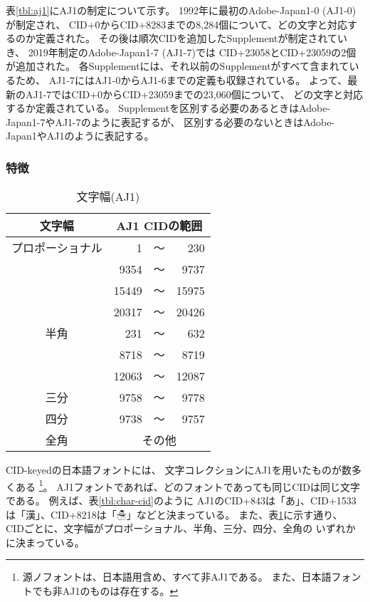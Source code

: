 表\ref{tbl:aj1}にAJ1の制定について示す。
1992年に最初のAdobe-Japan1-0 (AJ1-0)が制定され、
CID+0からCID+8283までの8,284個について、どの文字と対応するのか定義された。
その後は順次CIDを追加したSupplementが制定されていき、
2019年制定のAdobe-Japan1-7 (AJ1-7)では
CID+23058とCID+23059の2個が追加された。
各Supplementには、それ以前のSupplementがすべて含まれているため、
AJ1-7にはAJ1-0からAJ1-6までの定義も収録されている。
よって、最新のAJ1-7ではCID+0からCID+23059までの23,060個について、
どの文字と対応するか定義されている。
Supplementを区別する必要のあるときはAdobe-Japan1-7やAJ1-7のように表記するが、
区別する必要のないときはAdobe-Japan1やAJ1のように表記する。

\subsubsection{特徴}

\begin{table}[tb]
  \centering
  \caption{文字幅(AJ1)}
  \label{tbl:width}
  \small
  \begin{tabular}{c|rcr}
    文字幅 & \multicolumn{3}{c}{AJ1 CIDの範囲} \\
    \hline
    プロポーショナル
    &     1 & ～ &   230 \\
    &  9354 & ～ &  9737 \\
    & 15449 & ～ & 15975 \\
    & 20317 & ～ & 20426 \\
    \arrayrulecolor[gray]{0.7}\hline\arrayrulecolor[gray]{0}
    半角
    &   231 & ～ &   632 \\
    &  8718 & ～ &  8719 \\
    & 12063 & ～ & 12087 \\
    \arrayrulecolor[gray]{0.7}\hline\arrayrulecolor[gray]{0}
    三分
    &  9758 & ～ &  9778 \\
    \arrayrulecolor[gray]{0.7}\hline\arrayrulecolor[gray]{0}
    四分
    &  9738 & ～ &  9757 \\
    \arrayrulecolor[gray]{0.7}\hline\arrayrulecolor[gray]{0}
    全角
    & \multicolumn{3}{c}{その他}
  \end{tabular}
\end{table}

CID-keyedの日本語フォントには、
文字コレクションにAJ1を用いたものが数多くある
\footnote{源ノフォントは、日本語用含め、すべて非AJ1である。
  また、日本語フォントでも非AJ1のものは存在する。}。
AJ1フォントであれば、どのフォントであっても同じCIDは同じ文字である。
例えば、表\ref{tbl:char-cid}のように
AJ1のCID+843は「あ」、CID+1533は「漢」、CID+8218は「☃」などと決まっている。
また、表\ref{tbl:width}に示す通り、
CIDごとに、文字幅がプロポーショナル、半角、三分、四分、全角の
いずれかに決まっている。

